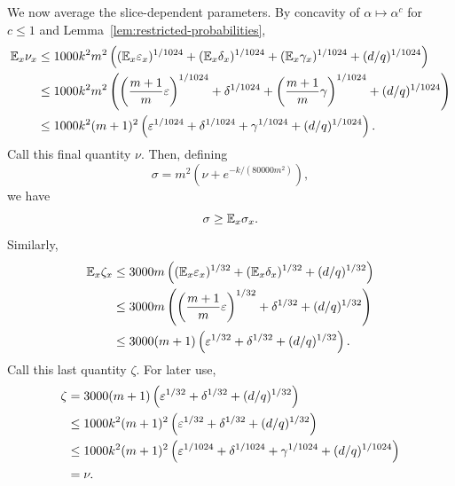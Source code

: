 	We now average the slice-dependent parameters. By concavity of $\alpha \mapsto \alpha^c$ for $c \le 1$ and Lemma~\ref{lem:restricted-probabilities},
	\begin{align*}
		\mathbb{E}_x \nu_x
		 & \le 1000k^2m^2\left((\mathbb{E}_x \varepsilon_x)^{1/1024}+(\mathbb{E}_x \delta_x)^{1/1024}+(\mathbb{E}_x \gamma_x)^{1/1024}+(d/q)^{1/1024}\right)                          \\
		 & \le 1000k^2m^2\left(\left(\frac{m+1}{m}\varepsilon\right)^{1/1024}+\delta^{1/1024}+\left(\frac{m+1}{m}\gamma\right)^{1/1024}+(d/q)^{1/1024}\right) \\
		 & \le 1000k^2(m+1)^2\left(\varepsilon^{1/1024}+\delta^{1/1024}+\gamma^{1/1024}+(d/q)^{1/1024}\right).
	\end{align*}
	Call this final quantity $\nu$. Then, defining
	\[
		\sigma = m^2\left(\nu + e^{-k/(80000m^2)}\right),
	\]
	we have
	\[
		\sigma \ge \mathbb{E}_x \sigma_x.
	\]
	Similarly,
	\begin{align*}
		\mathbb{E}_x \zeta_x
		 & \le 3000m\left((\mathbb{E}_x \varepsilon_x)^{1/32}+(\mathbb{E}_x \delta_x)^{1/32}+(d/q)^{1/32}\right)         \\
		 & \le 3000m\left(\left(\frac{m+1}{m}\varepsilon\right)^{1/32}+\delta^{1/32}+(d/q)^{1/32}\right) \\
		 & \le 3000(m+1)\left(\varepsilon^{1/32}+\delta^{1/32}+(d/q)^{1/32}\right).
	\end{align*}
	Call this last quantity $\zeta$. For later use,
	\begin{align}
		\zeta
		 & = 3000(m+1)\left(\varepsilon^{1/32}+\delta^{1/32}+(d/q)^{1/32}\right) \notag                              \\
		 & \le 1000k^2(m+1)^2\left(\varepsilon^{1/32}+\delta^{1/32}+(d/q)^{1/32}\right) \notag                       \\
		 & \le 1000k^2(m+1)^2\left(\varepsilon^{1/1024}+\delta^{1/1024}+\gamma^{1/1024}+(d/q)^{1/1024}\right) \notag \\
		 & = \nu. \label{eq:zeta-smaller-than-nu}
	\end{align}

